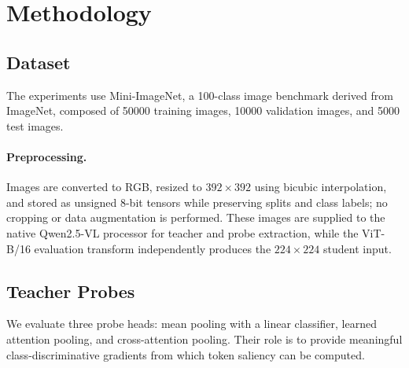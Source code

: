 \section{Methodology}
\label{sec:method}

\subsection{Dataset}

The experiments use Mini-ImageNet, a 100-class image benchmark derived from ImageNet, composed of 50000 training images, 10000 validation images, and 5000 test images.

\paragraph{Preprocessing.}
Images are converted to RGB, resized to $392\times392$ using bicubic interpolation, and stored as unsigned 8-bit tensors while preserving splits and class labels; no cropping or data augmentation is performed.
These images are supplied to the native Qwen2.5-VL processor for teacher and probe extraction, while the ViT-B/16 evaluation transform independently produces the $224\times224$ student input.


\subsection{Teacher Probes}

We evaluate three probe heads: mean pooling with a linear classifier, learned attention pooling, and cross-attention pooling. Their role is to provide meaningful class-discriminative gradients from which token saliency can be computed.

